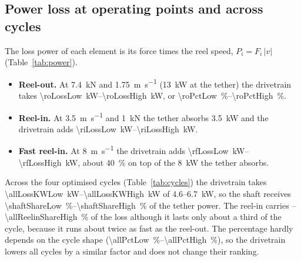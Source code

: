 \documentclass[11pt,a4paper]{article}
\begin{document}
\subsection{Power loss at operating points and across cycles}
The loss power of each element is its force times the reel speed,
$P_i = F_i\,|v|$ (Table~\ref{tab:power}).

\begin{table}[H]
\centering\scriptsize
\setlength{\tabcolsep}{3pt}
\caption{Loss power by component (W, low--high) at the operating points of
Table~\ref{tab:points}.}
\label{tab:power}
\resizebox{\textwidth}{!}{}
\end{table}

\begin{itemize}
  \item \textbf{Reel-out.} At \SI{7.4}{kN} and \SI{1.75}{m.s^{-1}}
    (\SI{13}{kW} at the tether) the drivetrain takes
    \SIrange{\roLossLow}{\roLossHigh}{kW}, or
    \SIrange{\roPctLow}{\roPctHigh}{\percent}.
  \item \textbf{Reel-in.} At \SI{3.5}{m.s^{-1}} and \SI{1}{kN} the tether
    absorbs \SI{3.5}{kW} and the drivetrain adds
    \SIrange{\riLossLow}{\riLossHigh}{kW}.
  \item \textbf{Fast reel-in.} At \SI{8}{m.s^{-1}} the drivetrain adds
    \SIrange{\rfLossLow}{\rfLossHigh}{kW}, about \SI{40}{\percent} on top of
    the \SI{8}{kW} the tether absorbs.
\end{itemize}

\begin{table}[H]
\centering\scriptsize
\caption{Cycle-mean mechanical loss power of GS1 on the optimised LEI-V3
cycles (low--high). ``Shaft'' is the mean power at the motor shaft, tether
power minus the loss.}
\label{tab:cycles}
\resizebox{\textwidth}{!}{}
\end{table}

Across the four optimised cycles (Table~\ref{tab:cycles}) the drivetrain takes
\SIrange{\allLossKWLow}{\allLossKWHigh}{kW} of 4.6--\SI{6.7}{kW}, so the shaft
receives \SIrange{\shaftShareLow}{\shaftShareHigh}{\percent} of the tether
power. The reel-in carries
\allReelinShareLow--\SI{\allReelinShareHigh}{\percent} of the loss although it
lasts only about a third of the cycle, because it runs about twice as fast as
the reel-out. The percentage hardly depends on the cycle shape
(\SIrange{\allPctLow}{\allPctHigh}{\percent}), so the drivetrain lowers all
cycles by a similar factor and does not change their ranking.
\end{document}
